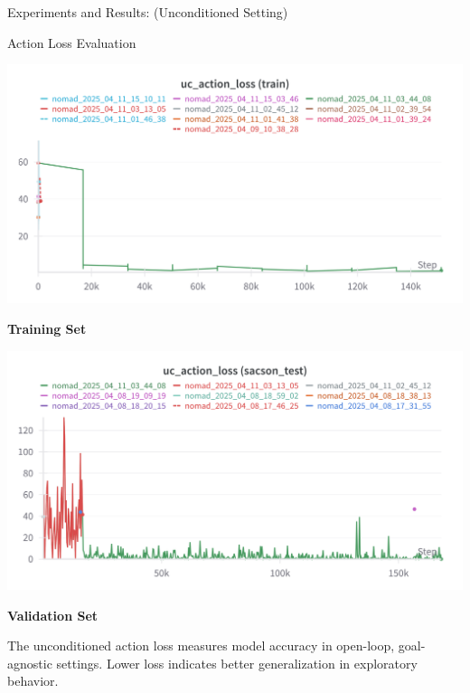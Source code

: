\documentclass{beamer}
\begin{document}
    \begin{frame}{Experiments and Results: (Unconditioned Setting)}
        \begin{block}{Action Loss Evaluation}
            \begin{minipage}{0.48\textwidth}
                \centering
                \includegraphics[width=\textwidth]{images/uc_action_train.png}
                
                \textbf{Training Set}
            \end{minipage}
            \hfill
            \begin{minipage}{0.48\textwidth}
                \centering
                \includegraphics[width=\textwidth]{images/uc_action_test.png}
                
                \textbf{Validation Set}
            \end{minipage}
            
            \vspace{0.5em}
            \bigskip
            The unconditioned action loss measures model accuracy in open-loop, goal-agnostic settings. Lower loss indicates better generalization in exploratory behavior.
        \end{block}
    \end{frame}
\end{document}
